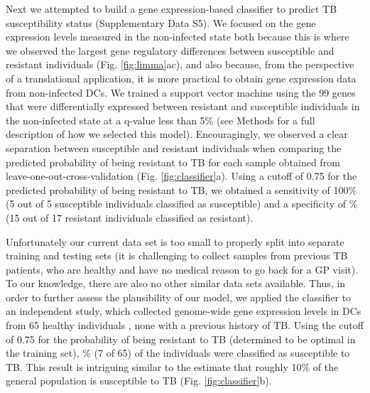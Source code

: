 \documentclass[fleqn,10pt]{wlscirep}
\begin{document}
Next we attempted to build a gene expression-based classifier to
predict TB susceptibility status (Supplementary Data S5). We focused
on the gene expression levels measured in the non-infected state both
because this is where we observed the largest gene regulatory
differences between susceptible and resistant individuals (Fig.
\ref{fig:limma}ac), and also because, from the perspective of a
translational application, it is more practical to obtain gene
expression data from non-infected DCs. We trained a support vector
machine using the 99 genes that were differentially expressed between
resistant and susceptible individuals in the non-infected state at a
q-value less than 5\% (see Methods for a full description of how we
selected this model). Encouragingly, we observed a clear separation
between susceptible and resistant individuals when comparing the
predicted probability of being resistant to TB for each sample
obtained from leave-one-out-cross-validation (Fig.
\ref{fig:classifier}a). Using a cutoff of 0.75 for the predicted
probability of being resistant to TB, we obtained a sensitivity of
100\% (5 out of 5 susceptible individuals classified as susceptible)
and a specificity of \% (15 out of 17 resistant
individuals classified as resistant).

Unfortunately our current data set is too small to properly split into
separate training and testing sets (it is challenging to collect
samples from previous TB patients, who are healthy and have no medical
reason to go back for a GP visit). To our knowledge, there are also no
other similar data sets available. Thus, in order to further assess
the plausibility of our model, we applied the classifier to an
independent study, which collected genome-wide gene expression levels
in DCs from 65 healthy individuals \cite{Barreiro2012}, none with a
previous history of TB. Using the cutoff of 0.75 for the probability
of being resistant to TB (determined to be optimal in the training
set), \% (7 of 65) of the individuals were classified
as susceptible to TB. This result is intriguing similar to the
estimate that roughly 10\% of the general population is susceptible to
TB (Fig. \ref{fig:classifier}b).
\end{document}
